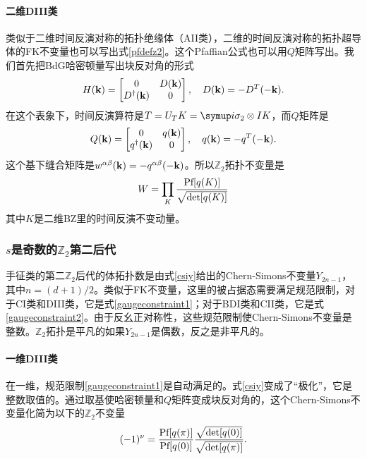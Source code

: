 \paragraph{二维DIII类}
类似于二维时间反演对称的拓扑绝缘体（AII类），二维的时间反演对称的拓扑超导体的FK不变量也可以写出式\eqref{pfdefz2}。这个Pfaffian公式也可以用$Q$矩阵写出。我们首先把BdG哈密顿量写出块反对角的形式
\begin{equation}
  H(\vb k) = \begin{bmatrix}
      0 & D(\vb k) \\
      D^\dagger(\vb k) & 0
  \end{bmatrix},\quad D(\vb k) = -D^T(-\vb k).
\end{equation}
在这个表象下，时间反演算符是$T=U_TK=\iu \sigma_2 \otimes I K$，而$Q$矩阵是
\begin{equation}
  Q(\vb k) = \begin{bmatrix}
      0 & q(\vb k) \\
      q^\dagger(\vb k) & 0
  \end{bmatrix},\quad q(\vb k) = -q^T(-\vb k).
\end{equation}
这个基下缝合矩阵是$w^{\alpha\beta}(\vb k) = -q^{\alpha\beta}(-\vb k)$。所以$\mathbb Z_2$拓扑不变量是
\begin{equation}
  W=\prod_K \frac{\textnormal{Pf}[q(K)]}{\sqrt{\det [q(K)]}}
\end{equation}
其中$K$是二维BZ里的时间反演不变动量。

\subsubsection{$s$是奇数的$\mathbb Z_2$第二后代}

手征类的第二$\mathbb Z_2$后代的体拓扑数是由式\eqref{csiy}给出的Chern-Simons不变量$Y_{2n-1}$，其中$n=(d+1)/2$。类似于FK不变量，这里的被占据态需要满足规范限制，对于CI类和DIII类，它是式\eqref{gaugeconstraint1}；对于BDI类和CII类，它是式\eqref{gaugeconstraint2}。由于反幺正对称性，这些规范限制使Chern-Simons不变量是整数。$\mathbb Z_2$拓扑是平凡的如果$Y_{2n-1}$是偶数，反之是非平凡的。

\paragraph{一维DIII类}
在一维，规范限制\eqref{gaugeconstraint1}是自动满足的。式\eqref{csiy}变成了“极化”，它是整数取值的。通过取基使哈密顿量和$Q$矩阵变成块反对角的，这个Chern-Simons不变量化简为以下的$\mathbb Z_2$不变量
\begin{equation}
  (-1)^\nu = \frac{\textnormal{Pf}[q(\pi)]}{\textnormal{Pf}[q(0)]}\frac{\sqrt{\det[q(0)]}}{\sqrt{\det[q(\pi)]}}.
\end{equation}

